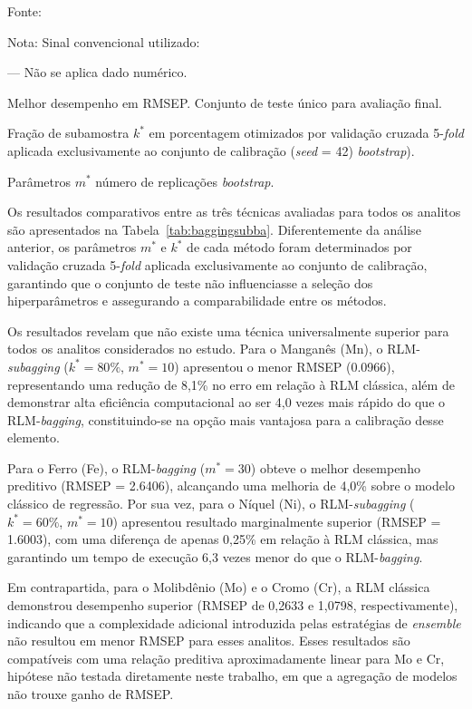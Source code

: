 \begin{table}[htbp]
\begin{threeparttable}
\begin{tablenotes}[flushleft]
  \footnotesize
  \item \footnotesize{Fonte:~\oautor}
	\item Nota: Sinal convencional utilizado:
	\item --- Não se aplica dado numérico.
	\item[a] Melhor desempenho em RMSEP. Conjunto de teste único para avaliação final.
	\item[b] Fração de subamostra $k^*$ em porcentagem otimizados por validação cruzada 5-\textit{fold} aplicada exclusivamente ao conjunto de calibração (\textit{seed} = 42) \textit{bootstrap}).
	\item[c] Parâmetros $m^*$ número de replicações \textit{bootstrap}.
\end{tablenotes}
\end{threeparttable} %
\end{table}


Os resultados comparativos entre as três técnicas avaliadas para todos os analitos são apresentados na Tabela~\ref{tab:baggingsubba}. 
Diferentemente da análise anterior, os parâmetros $m^*$ e $k^*$ de cada método foram determinados por validação cruzada 5-\textit{fold} 
aplicada exclusivamente ao conjunto de calibração, garantindo que o conjunto de teste não influenciasse a seleção dos hiperparâmetros e 
assegurando a comparabilidade entre os métodos.

Os resultados revelam que não existe uma técnica universalmente superior para todos os analitos considerados no estudo. Para o Manganês (Mn), o RLM-\textit{subagging} ($k^* = 80\%$, $m^* = 10$) apresentou o menor RMSEP (\num{0,0966}), representando uma redução de 8,1\% no erro em relação à RLM clássica, além de demonstrar alta eficiência computacional ao ser 4,0 vezes mais rápido do que o RLM-\textit{bagging}, constituindo-se na opção mais vantajosa para a calibração desse elemento.

Para o Ferro (Fe), o RLM-\textit{bagging} ($m^* = 30$) obteve o melhor desempenho preditivo (RMSEP = \num{2,6406}), alcançando uma melhoria de 4,0\% sobre o modelo clássico de regressão. Por sua vez, para o Níquel (Ni), o RLM-\textit{subagging} ($k^* = 60\%$, $m^* = 10$) apresentou resultado marginalmente superior (RMSEP = \num{1,6003}), com uma diferença de apenas 0,25\% em relação à RLM clássica, mas garantindo um tempo de execução 6,3 vezes menor do que o RLM-\textit{bagging}.

Em contrapartida, para o Molibdênio (Mo) e o Cromo (Cr), a RLM 
clássica demonstrou desempenho superior (RMSEP de 0,2633 e 1,0798, 
respectivamente), indicando que a complexidade adicional introduzida 
pelas estratégias de \textit{ensemble} não resultou em menor RMSEP 
para esses analitos. Esses resultados são compatíveis com uma relação 
preditiva aproximadamente linear para Mo e Cr, hipótese não testada 
diretamente neste trabalho, em que a agregação de modelos não trouxe ganho de RMSEP.

